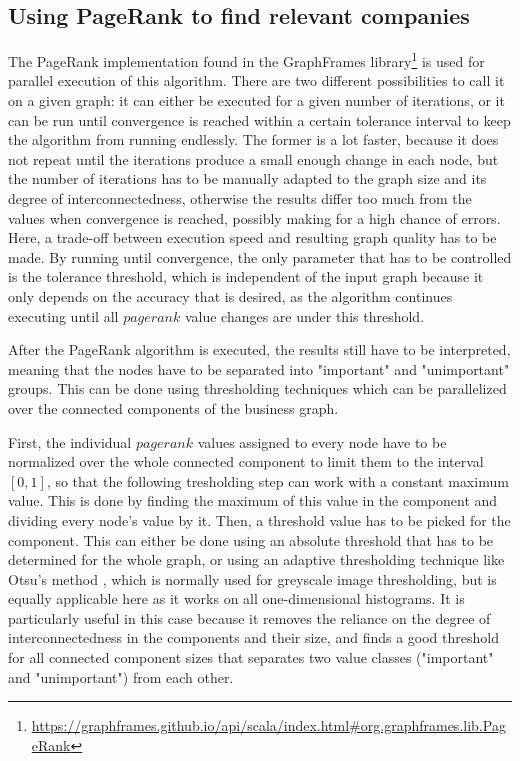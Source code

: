 \documentclass[
        a4paper,     %
        titlepage,   %
        oneside,     %
        parskip      %
]{scrartcl}          %
\begin{document}
  \subsection{Using PageRank to find relevant companies}
  The PageRank implementation found in the GraphFrames
  library\footnote{\url{https://graphframes.github.io/api/scala/index.html\#org.graphframes.lib.PageRank}}
  is used for parallel execution of this algorithm.
  There are two different possibilities to call it on a given graph: it can either
  be executed for a given number of iterations, or it can be run until convergence
  is reached within a certain tolerance interval to keep the algorithm from running endlessly.
  The former is a lot faster, because it does not repeat until the iterations produce
  a small enough change in each node, but the number of iterations
  has to be manually adapted to the graph size and its degree of interconnectedness,
  otherwise the results differ too much from the values when convergence is reached,
  possibly making for a high chance of errors. Here, a trade-off between execution
  speed and resulting graph quality has to be made.
  By running until convergence, the only parameter that has to be controlled is the tolerance threshold,
  which is independent of the input graph because it only depends on the accuracy that is desired,
  as the algorithm continues executing until all $pagerank$ value changes
  are under this threshold.

  After the PageRank algorithm is executed, the results still have to be interpreted,
  meaning that the nodes have to be separated into "important" and "unimportant" groups.
  This can be done using thresholding techniques which can be parallelized
  over the connected components of the business graph.

  First, the individual $pagerank$ values assigned to every node have to be normalized
  over the whole connected component to limit them to the interval $[0, 1]$,
  so that the following tresholding step can work with a constant maximum value.
  This is done by finding the maximum of this
  value in the component and dividing every node's value by it.
  Then, a threshold value has to be picked for the component. This can either be done
  using an absolute threshold that has to be determined for the whole graph, or
  using an adaptive thresholding technique like Otsu's method \cite{otsu1979threshold},
  which is normally used for greyscale image thresholding, but is equally applicable
  here as it works on all one-dimensional histograms.
  It is particularly useful in this case because it removes the reliance
  on the degree of interconnectedness in the components and their size,
  and finds a good threshold for all connected component sizes that separates
  two value classes ("important" and "unimportant") from each other.
\end{document}
